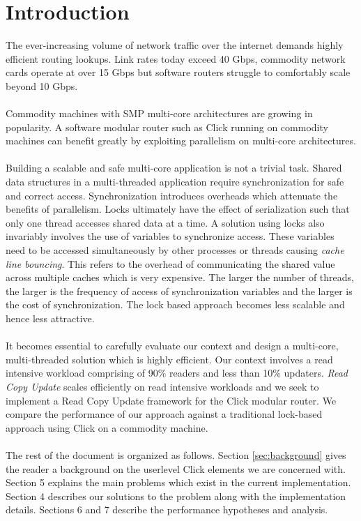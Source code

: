 \documentclass{article}
\begin{document}
\section{Introduction}
The ever-increasing volume of network traffic over the internet demands highly efficient routing lookups. Link rates today exceed 40 Gbps, commodity network cards operate at over 15 Gbps but software routers struggle to comfortably scale beyond 10 Gbps. 
\\\\ Commodity machines with SMP multi-core architectures are growing in popularity. A software modular router such as Click running on commodity machines  can benefit greatly by exploiting parallelism on multi-core architectures.
\\\\ Building a scalable and safe multi-core application is not a trivial task. Shared data structures in a multi-threaded application require synchronization for safe and correct access. Synchronization introduces overheads which attenuate the benefits of parallelism. Locks ultimately have the effect of  serialization such that only one thread accesses shared data at a time. A solution using locks also invariably involves the use of variables to synchronize access. These variables need to be accessed simultaneously by other processes or threads causing \emph{cache line bouncing}. This refers to the overhead of communicating the shared value across multiple caches which is very expensive. The larger the number of threads, the larger is the frequency of access of synchronization variables and the larger is the cost of synchronization. The lock based approach becomes less scalable and hence less attractive. 
\\\\ It becomes essential to carefully evaluate our context and design a multi-core, multi-threaded solution which is highly efficient. Our context involves a read intensive workload comprising of 90\% readers and less than 10\% updaters. \emph{Read Copy Update} \cite{readcopyupdate} scales efficiently on read intensive workloads and we seek to implement a Read Copy Update framework for the Click modular router. We compare the performance of our approach against a traditional lock-based approach using Click on a commodity machine. 
\\\\ The rest of the document is organized as follows. Section \ref{sec:background} gives the reader a background on the userlevel Click elements we are concerned with. Section 5 explains the main problems which exist in the current implementation. Section 4 describes our solutions to the problem along with the implementation details. Sections 6 and 7 describe the performance hypotheses and analysis.
\end{document}
